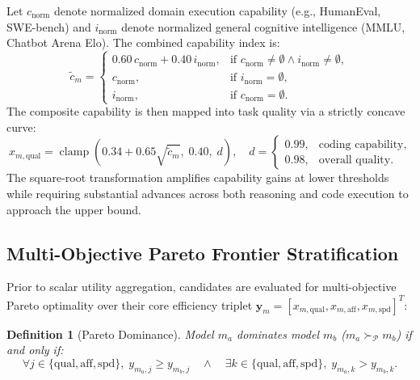 \documentclass[pdflatex,sn-mathphys-num]{sn-jnl}
\theoremstyle{thmstyleone}
\theoremstyle{thmstylethree}
\newtheorem{definition}{Definition}
\begin{document}
Let $c_{\text{norm}}$ denote normalized domain execution capability (e.g., HumanEval, SWE-bench) and $i_{\text{norm}}$ denote normalized general cognitive intelligence (MMLU, Chatbot Arena Elo). The combined capability index is:
\begin{equation}\label{eq:dual_signal}
\tilde{c}_m = \begin{cases}
0.60 \, c_{\text{norm}} + 0.40 \, i_{\text{norm}}, & \text{if } c_{\text{norm}} \neq \emptyset \land i_{\text{norm}} \neq \emptyset, \\
c_{\text{norm}}, & \text{if } i_{\text{norm}} = \emptyset, \\
i_{\text{norm}}, & \text{if } c_{\text{norm}} = \emptyset.
\end{cases}
\end{equation}
The composite capability is then mapped into task quality via a strictly concave curve:
\begin{equation}\label{eq:quality_curve}
x_{m, \text{qual}} = \operatorname{clamp}\left( 0.34 + 0.65 \sqrt{\tilde{c}_m}, \; 0.40, \; d \right), \quad d = \begin{cases} 0.99, & \text{coding capability}, \\ 0.98, & \text{overall quality}. \end{cases}
\end{equation}
The square-root transformation amplifies capability gains at lower thresholds while requiring substantial advances across both reasoning and code execution to approach the upper bound.

\subsection{Multi-Objective Pareto Frontier Stratification}\label{subsec:pareto}

Prior to scalar utility aggregation, candidates are evaluated for multi-objective Pareto optimality over their core efficiency triplet $\mathbf{y}_m = [x_{m, \text{qual}}, x_{m, \text{aff}}, x_{m, \text{spd}}]^T$:

\begin{definition}[Pareto Dominance]\label{def:pareto}
Model $m_a$ dominates model $m_b$ ($m_a \succ_{\mathcal{P}} m_b$) if and only if:
\begin{equation}\label{eq:pareto_def}
\forall j \in \{\text{qual}, \text{aff}, \text{spd}\}, \; y_{m_a, j} \ge y_{m_b, j} \quad \land \quad \exists k \in \{\text{qual}, \text{aff}, \text{spd}\}, \; y_{m_a, k} > y_{m_b, k}.
\end{equation}
\end{definition}
\end{document}
